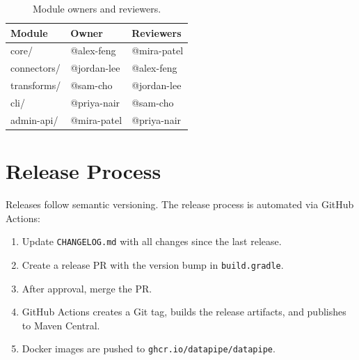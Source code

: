 \documentclass[
    language=english,
    doctype=manual,
    institution=none,
    titlestyle=book,
    oneside,
]{../../omnilatex}
\begin{document}
\begin{table}[htbp]
    \centering
    \caption{Module owners and reviewers.}
    \label{tab:owners}
    \begin{tabular}{@{}lll@{}}
        \toprule
        Module & Owner & Reviewers \\
        \midrule
        core/ & @alex-feng & @mira-patel \\
        connectors/ & @jordan-lee & @alex-feng \\
        transforms/ & @sam-cho & @jordan-lee \\
        cli/ & @priya-nair & @sam-cho \\
        admin-api/ & @mira-patel & @priya-nair \\
        \bottomrule
    \end{tabular}
\end{table}

\chapter{Release Process}
\label{sec:release}

Releases follow semantic versioning. The release process is automated
via GitHub Actions:

\begin{enumerate}
    \item Update \texttt{CHANGELOG.md} with all changes since the last
        release.
    \item Create a release PR with the version bump in
        \texttt{build.gradle}.
    \item After approval, merge the PR.
    \item GitHub Actions creates a Git tag, builds the release artifacts,
        and publishes to Maven Central.
    \item Docker images are pushed to \texttt{ghcr.io/datapipe/datapipe}.
\end{enumerate}

\printbibliography[heading=bibintoc, title={References}]
\end{document}
